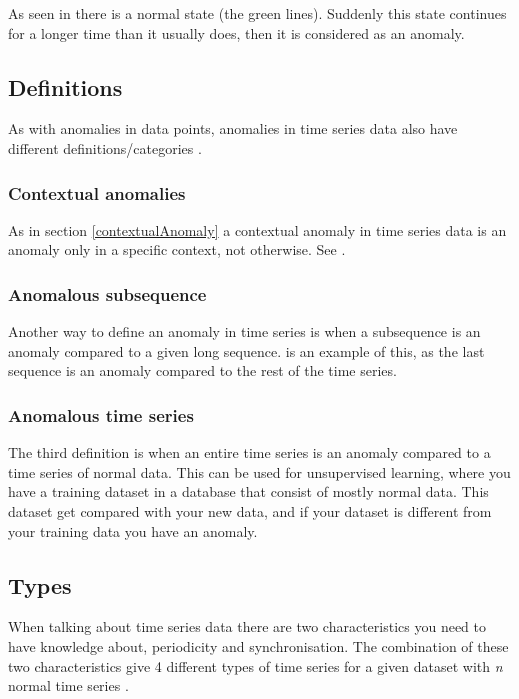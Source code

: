 \documentclass[english, a4paper]{report}
\begin{document}
{{        As seen in  there is a normal state (the green lines). Suddenly this state continues for a longer time than it usually does, then it is considered as an anomaly.
        
        \subsection{Definitions}
        {
            As with anomalies in data points, anomalies in time series data also have different definitions/categories \cite{anomalyDetectionOfTimeSeries}.
            
            \subsubsection{Contextual anomalies}
            {
                As in section \ref{contextualAnomaly} a contextual anomaly in time series data is an anomaly only in a specific context, not otherwise. See .
            }
            
            \subsubsection{Anomalous subsequence}
            {
                Another way to define an anomaly in time series is when a subsequence is an anomaly compared to a given long sequence.  is an example of this, as the last sequence is an anomaly compared to the rest of the time series.
            }
            
            \subsubsection{Anomalous time series}
            {
                The third definition is when an entire time series is an anomaly compared to a time series of normal data. This can be used for unsupervised learning, where you have a training dataset in a database that consist of mostly normal data. This dataset get compared with your new data, and if your dataset is different from your training data you have an anomaly. 
            }
        }
        
        \subsection{Types}\label{anomTimeTypes}
        {
            When talking about time series data there are two characteristics you need to have knowledge about, periodicity and synchronisation. The combination of these two characteristics give 4 different types of time series for a given dataset with \textit{n} normal time series \cite{anomalyDetectionOfTimeSeries}.
            
}}}
\end{document}
